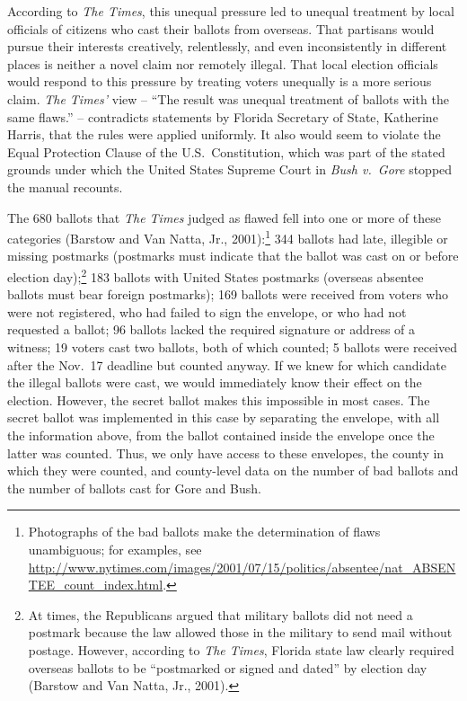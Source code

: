 \documentclass[11pt,titlepage]{article}
\begin{document}
According to \emph{The Times}, this unequal pressure led to unequal
treatment by local officials of citizens who cast their ballots from
overseas.  That partisans would pursue their interests creatively,
relentlessly, and even inconsistently in different places is neither a
novel claim nor remotely illegal.  That local election officials would
respond to this pressure by treating voters unequally is a more
serious claim. \emph{The Times'} view -- ``The result was unequal
treatment of ballots with the same flaws.'' -- contradicts statements
by Florida Secretary of State, Katherine Harris, that the rules were
applied uniformly.  It also would seem to violate the Equal Protection
Clause of the U.S.\ Constitution, which was part of the stated grounds
under which the United States Supreme Court in \emph{Bush v.\ Gore}
stopped the manual recounts.

The 680 ballots that \emph{The Times} judged as flawed fell into one
or more of these categories (Barstow and Van Natta, Jr.,
2001):\footnote{Photographs of the bad ballots make the determination
  of flaws unambiguous; for examples, see
  \url{http://www.nytimes.com/images/2001/07/15/politics/absentee/nat_ABSENTEE_count_index.html}.}
344 ballots had late, illegible or missing postmarks (postmarks must
indicate that the ballot was cast on or before election
day);\footnote{At times, the Republicans argued that military ballots
  did not need a postmark because the law allowed those in the
  military to send mail without postage.  However, according to
  \emph{The Times}, Florida state law clearly required overseas
  ballots to be ``postmarked or signed and dated'' by election day
  (Barstow and Van Natta, Jr., 2001).}  183 ballots with United States
postmarks (overseas absentee ballots must bear foreign postmarks); 169
ballots were received from voters who were not registered, who had
failed to sign the envelope, or who had not requested a ballot; 96
ballots lacked the required signature or address of a witness; 19
voters cast two ballots, both of which counted; 5 ballots were
received after the Nov.\ 17 deadline but counted anyway.  If we knew
for which candidate the illegal ballots were cast, we would
immediately know their effect on the election. However, the secret
ballot makes this impossible in most cases.  The secret ballot was
implemented in this case by separating the envelope, with all the
information above, from the ballot contained inside the envelope once
the latter was counted.  Thus, we only have access to these envelopes,
the county in which they were counted, and county-level data on the
number of bad ballots and the number of ballots cast for Gore and
Bush.
\end{document}
